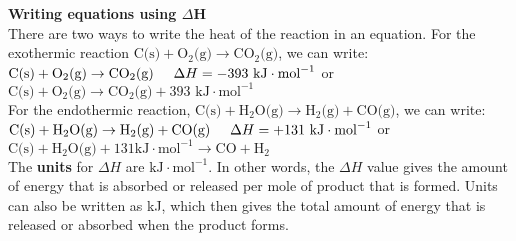 \textbf{Writing equations using $\Delta$H}\\
There are two ways to write the heat of the reaction in an equation.
For the exothermic reaction $\text{C(s)} + \text{O}_{2}\text{(g)} \rightarrow \text{CO}_{2}\text{(g)}$, we can write:\\
$\text{C(s)} + \text{O}_{2}\text{(g)} \rightarrow \text{CO}_{2}\text{(g)} \hspace{.5cm} \Delta H = -393 \text{ kJ} \cdot \text{mol}^{-1}$ or\\
$\text{C(s)} + \text{O}_{2}\text{(g)} \rightarrow \text{CO}_{2}\text{(g)} + 393 \text{ kJ} \cdot \text{mol}^{-1}$\\
For the endothermic reaction, $\text{C(s)} + \text{H}_{2}\text{O(g)} \rightarrow \text{H}_{2}\text{(g)} + \text{CO(g)}$, we can write:\\
$\text{C(s)} + \text{H}_{2}\text{O(g)} \rightarrow \text{H}_{2}\text{(g)} + \text{CO(g)} \hspace{.5cm} \Delta H = +131 \text{ kJ} \cdot \text{mol}^{-1}$ or\\
$\text{C(s)} + \text{H}_{2}\text{O(g)} + 131 \text{kJ} \cdot \text{mol}^{-1} \rightarrow \text{CO} + \text{H}_{2}$ \\
The \textbf{units} for $\Delta H$ are $\text{kJ} \cdot \text{mol}^{-1}$.  In other words, the $\Delta H$ value gives the amount of energy that is absorbed or released per mole of product that is formed. Units can also be written as kJ, which then gives the total amount of energy that is released or absorbed when the product forms.


